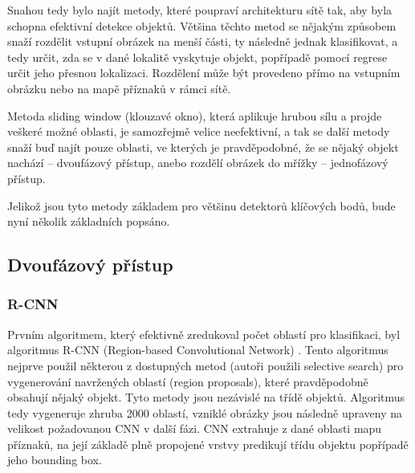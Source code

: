 Snahou tedy bylo najít metody, které poupraví architekturu sítě tak, aby byla
schopna efektivní detekce objektů. Většina těchto metod se nějakým způsobem
snaží rozdělit vstupní obrázek na menší části, ty následně jednak klasifikovat,
a tedy určit, zda se v dané lokalitě vyskytuje objekt, popřípadě pomocí regrese
určit jeho přesnou lokalizaci. Rozdělení může být provedeno přímo na vstupním
obrázku nebo na mapě příznaků v rámci sítě.

Metoda sliding window (klouzavé okno), která aplikuje hrubou sílu a projde
veškeré možné oblasti, je samozřejmě velice neefektivní, a tak se další metody
snaží buď najít pouze oblasti, ve kterých je pravděpodobné, že se nějaký objekt
nachází – dvoufázový přístup, anebo rozdělí obrázek do mřížky – jednofázový
přístup.

Jelikož jsou tyto metody základem pro většinu detektorů klíčových bodů, bude
nyní několik základních popsáno.





\subsection{Dvoufázový přístup}

\subsubsection*{R-CNN}
Prvním algoritmem, který efektivně zredukoval počet oblastí pro klasifikaci,
byl algoritmus R-CNN (Region-based Convolutional Network) \cite{r-cnn}. Tento
algoritmus nejprve použil některou z dostupných metod (autoři použili selective
search) pro vygenerování navržených oblastí (region proposals), které
pravděpodobně obsahují nějaký objekt. Tyto metody jsou nezávislé na třídě
objektů. Algoritmus tedy vygeneruje zhruba 2000 oblastí, vzniklé obrázky jsou
následně upraveny na velikost požadovanou CNN v další fázi. CNN extrahuje z
dané oblasti mapu příznaků, na její základě plně propojené vrstvy predikují
třídu objektu popřípadě jeho bounding box.

